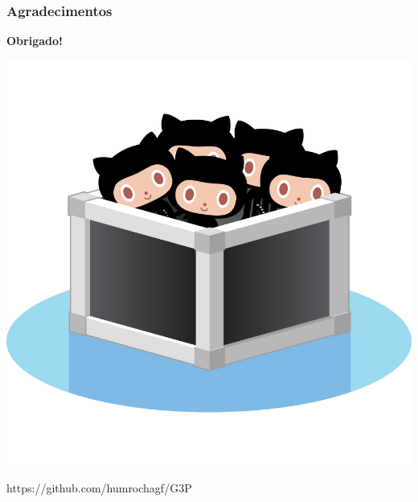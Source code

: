 \documentclass{beamer}
\begin{document}
\begin{frame}
  \frametitle{Agradecimentos}
  \begin{center}
    \textbf{\LARGE
      Obrigado!
    }

    \includegraphics[width=.3\textwidth]{repo.jpg}

    https://github.com/humrochagf/G3P
  \end{center}
\end{frame}
\end{document}
